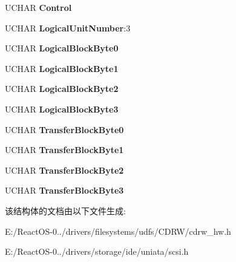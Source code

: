 \begin{DoxyCompactItemize}
U\+C\+H\+AR {\bfseries Control}
\item 
\mbox{\label{struct___c_d_b_1_1___p_l_x_t_r___r_e_a_d___c_d_d_a_a4edcea81c1316cd4326491dcc17a2d10}} 
U\+C\+H\+AR {\bfseries Logical\+Unit\+Number}\+:3
\item 
\mbox{\label{struct___c_d_b_1_1___p_l_x_t_r___r_e_a_d___c_d_d_a_af3422e8f7abb374dcafee6154fb065a8}} 
U\+C\+H\+AR {\bfseries Logical\+Block\+Byte0}
\item 
\mbox{\label{struct___c_d_b_1_1___p_l_x_t_r___r_e_a_d___c_d_d_a_a52f39214ad10b46b583a41481ea84679}} 
U\+C\+H\+AR {\bfseries Logical\+Block\+Byte1}
\item 
\mbox{\label{struct___c_d_b_1_1___p_l_x_t_r___r_e_a_d___c_d_d_a_a025db0d66ed961244289a6de1a9e4d38}} 
U\+C\+H\+AR {\bfseries Logical\+Block\+Byte2}
\item 
\mbox{\label{struct___c_d_b_1_1___p_l_x_t_r___r_e_a_d___c_d_d_a_a01b09c5c863757c833e791a0eba2ec68}} 
U\+C\+H\+AR {\bfseries Logical\+Block\+Byte3}
\item 
\mbox{\label{struct___c_d_b_1_1___p_l_x_t_r___r_e_a_d___c_d_d_a_a8a2604200b3d7a297d19681b85d27948}} 
U\+C\+H\+AR {\bfseries Transfer\+Block\+Byte0}
\item 
\mbox{\label{struct___c_d_b_1_1___p_l_x_t_r___r_e_a_d___c_d_d_a_ad5754eb97780d3c455eb986cd84f7bc1}} 
U\+C\+H\+AR {\bfseries Transfer\+Block\+Byte1}
\item 
\mbox{\label{struct___c_d_b_1_1___p_l_x_t_r___r_e_a_d___c_d_d_a_a0f4884dbb26db7704c22c8db0b85e4a5}} 
U\+C\+H\+AR {\bfseries Transfer\+Block\+Byte2}
\item 
\mbox{\label{struct___c_d_b_1_1___p_l_x_t_r___r_e_a_d___c_d_d_a_ac45e03c0b3fdc9fee6811f55d0eaa228}} 
U\+C\+H\+AR {\bfseries Transfer\+Block\+Byte3}
\end{DoxyCompactItemize}


该结构体的文档由以下文件生成\+:\begin{DoxyCompactItemize}
\item 
E\+:/\+React\+O\+S-\/0../drivers/filesystems/udfs/\+C\+D\+R\+W/cdrw\+\_\+hw.\+h\item 
E\+:/\+React\+O\+S-\/0../drivers/storage/ide/uniata/scsi.\+h\end{DoxyCompactItemize}

